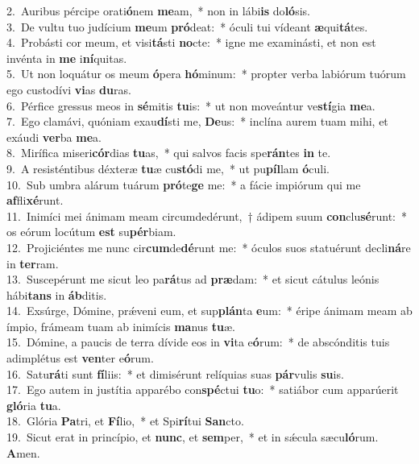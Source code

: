 {2.~}Auribus pércipe orati\textbf{ó}nem \textbf{me}am,~* non in lábi\textbf{is} do\textbf{ló}sis.\\
{3.~}De vultu tuo judícium \textbf{me}um \textbf{pró}deat:~* óculi tui vídeant \textbf{æ}qui\textbf{tá}tes.\\
{4.~}Probásti cor meum, et visi\textbf{tá}sti \textbf{no}cte:~* igne me examinásti, et non est invénta in \textbf{me} i\textbf{ní}quitas.\\
{5.~}Ut non loquátur os meum \textbf{ó}pera \textbf{hó}minum:~* propter verba labiórum tuórum ego custodívi \textbf{vi}as \textbf{du}ras.\\
{6.~}Pérfice gressus meos in \textbf{sé}mitis \textbf{tu}is:~* ut non moveántur ve\textbf{stí}gia \textbf{me}a.\\
{7.~}Ego clamávi, quóniam exau\textbf{dí}sti me, \textbf{De}us:~* inclína aurem tuam mihi, et exáudi \textbf{ver}ba \textbf{me}a.\\
{8.~}Mirífica miseri\textbf{cór}dias \textbf{tu}as,~* qui salvos facis spe\textbf{rán}tes \textbf{in} te.\\
{9.~}A resisténtibus déxteræ \textbf{tu}æ cu\textbf{stó}di me,~* ut pu\textbf{píl}lam \textbf{ó}culi.\\
{10.~}Sub umbra alárum tuárum \textbf{pró}te\textbf{ge} me:~* a fácie impiórum qui me \textbf{af}fli\textbf{xé}runt.\\
{11.~}Inimíci mei ánimam meam circumdedérunt,~† ádipem suum \textbf{con}clu\textbf{sé}runt:~* os eórum locútum \textbf{est} su\textbf{pér}biam.\\
{12.~}Projiciéntes me nunc cir\textbf{cum}de\textbf{dé}runt me:~* óculos suos statuérunt decli\textbf{ná}re in \textbf{ter}ram.\\
{13.~}Suscepérunt me sicut leo pa\textbf{rá}tus ad \textbf{præ}dam:~* et sicut cátulus leónis hábi\textbf{tans} in \textbf{áb}ditis.\\
{14.~}Exsúrge, Dómine, prǽveni eum, et sup\textbf{plán}ta \textbf{e}um:~* éripe ánimam meam ab ímpio, frámeam tuam ab inimícis \textbf{ma}nus \textbf{tu}æ.\\
{15.~}Dómine, a paucis de terra dívide eos in \textbf{vi}ta e\textbf{ó}rum:~* de abscónditis tuis adimplétus est \textbf{ven}ter e\textbf{ó}rum.\\
{16.~}Satu\textbf{rá}ti sunt \textbf{fí}liis:~* et dimisérunt relíquias suas \textbf{pár}vulis \textbf{su}is.\\
{17.~}Ego autem in justítia apparébo con\textbf{spé}ctui \textbf{tu}o:~* satiábor cum apparúerit \textbf{gló}ria \textbf{tu}a.\\
{18.~}Glória \textbf{Pa}tri, et \textbf{Fí}lio,~* et Spi\textbf{rí}tui \textbf{San}cto.\\
{19.~}Sicut erat in princípio, et \textbf{nunc}, et \textbf{sem}per,~* et in sǽcula sæcu\textbf{ló}rum. \textbf{A}men.\\

